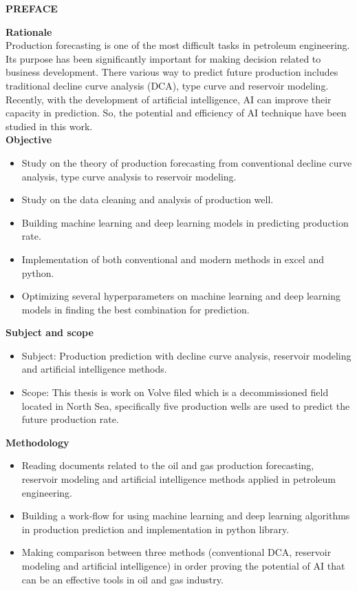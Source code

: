 \documentclass[12pt,a4paper]{report}
\begin{document}
\newpage
\begin{center}
\textbf{PREFACE}
\end{center}
\textbf{Rationale}\\
Production forecasting is one of the most difficult tasks in petroleum engineering. Its purpose has been significantly important for making decision related to business development. There various way to predict future production includes traditional decline curve analysis (DCA), type curve and reservoir modeling. Recently, with the development of artificial intelligence, AI can improve their capacity in prediction. So, the potential and efficiency of AI technique have been studied in this work.\\
\textbf{Objective}
\begin{itemize}
	\item Study on the theory of production forecasting from conventional decline curve analysis, type curve analysis to reservoir modeling.
	\item Study on the data cleaning and analysis of production well.
	\item Building machine learning and deep learning models in predicting production rate.
	\item Implementation of both conventional and modern methods in excel and python.
	\item Optimizing several hyperparameters on machine learning and deep learning models in finding the best combination for prediction.
\end{itemize}
\textbf{Subject and scope}
\begin{itemize}
	\item Subject: Production prediction with decline curve analysis, reservoir modeling and artificial intelligence methods. 
	\item Scope: This thesis is work on Volve filed which is a decommissioned field located in North Sea, specifically five production wells are used to predict the future production rate.
\end{itemize}
\textbf{Methodology}
\begin{itemize}
	\item Reading documents related to the oil and gas production forecasting, reservoir modeling and artificial intelligence methods applied in petroleum engineering.
	\item Building a work-flow for using machine learning and deep learning algorithms in production prediction and implementation in python library.
	\item Making comparison between three methods (conventional DCA, reservoir modeling and artificial intelligence) in order proving the potential of AI that can be an effective tools in oil and gas industry.
\end{itemize}
\end{document}
